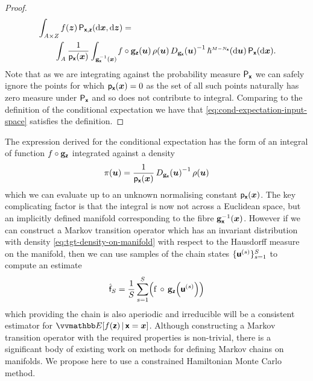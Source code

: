 \begin{proof}
\begin{equation*}
\begin{split}
  &\int_{\set{A} \times \set{Z}}
    f(\vct{z}) 
  \,\prob{\rvct{x},\rvct{z}}(\dr\vct{x},\dr\vct{z}) =\,\\
  &\qquad
  \int_{\set{A}}
  \frac{1}{\pden{\rvct{x}}(\vct{x})}
  \int_{\preimage{\genfunc_{\rvct{x}}}{\vct{x}}}\kern-1pt
   f\circ\genfunc_{\rvct{z}}(\vct{u})\,
   \rho(\vct{u})\,
   \jacobproddet{\genfunc_{\rvct{x}}}{\vct{u}}^{-1}
  \,\haum{M-{N_{\rvct{x}}}}(\dr\vct{u})
  \,\prob{\rvct{x}}(\dr\vct{x}).
\end{split}
\end{equation*}
Note that as we are integrating against the probability measure $\mathsf{P}_{\boldsymbol{\mathsf{x}}}$ we can safely ignore the points for which $\mathsf{p}_{\boldsymbol{\mathsf{x}}}(\boldsymbol{x}) = 0$ as the set of all such points naturally has zero measure under $\mathsf{P}_{\boldsymbol{\mathsf{x}}}$ and so does not contribute to integral. Comparing to the definition of the conditional expectation we have that \eqref{eq:cond-expectation-input-space} satisfies the definition. \qedhere
\end{proof}

The expression derived for the conditional expectation has the form of an integral of function $f \circ {\mathbf{g}}_{\boldsymbol{\mathsf{z}}}$ integrated against a density
\begin{equation}\label{eq:tgt-density-on-manifold}
    \pi(\vct{u}) =
    \frac{1}{\pden{\rvct{x}}(\vct{x})}\,
    \jacobproddet{\genfunc_{\rvct{x}}}{\vct{u}}^{-1}\,
    \rho(\vct{u}) 
\end{equation}
which we can evaluate up to an unknown normalising constant $\mathsf{p}_{\boldsymbol{\mathsf{x}}}(\boldsymbol{x})$. The key complicating factor is that the integral is now not across a Euclidean space, but an implicitly defined manifold corresponding to the fibre ${\mathbf{g}}_{\boldsymbol{\mathsf{x}}}^{-1}(\boldsymbol{x})$. However if we can construct a Markov transition operator which has an invariant distribution with density \eqref{eq:tgt-density-on-manifold} with respect to the Hausdorff measure on the manifold, then we can use samples of the chain states $\lbrace\boldsymbol{\mathsf{u}}^{(s)}\rbrace_{s=1}^S$ to compute an estimate
\begin{equation}\label{eq:mc-est-cond-expc}
    \hat{\rvar{f}}_S =
    \frac{1}{S} 
    \sum_{s=1}^S \lpa
      \func{f}\,\circ\,\genfunc_{\rvct{z}}\lpa\rvct{u}^{(s)}\rpa
    \rpa
\end{equation}
which providing the chain is also aperiodic and irreducible will be a consistent estimator for $\expc{f(\rvct{z}) \gvn \rvct{x} = \vct{x}}$. Although constructing a Markov transition operator with the required properties is non-trivial, there is a significant body of existing work on methods for defining Markov chains on manifolds. We propose here to use a constrained Hamiltonian Monte Carlo method.

